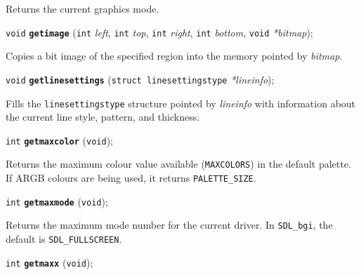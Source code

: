\documentclass[a4paper,12pt]{article}
\newcommand{\SDLbgi}{\texttt{SDL\_bgi}}
\newcommand{\V}{\texttt{void}}      %
\newcommand{\I}{\texttt{int}}       %
\newcommand{\func}[1]{\textbf{\texttt{#1}}}  %
\newcommand{\A}[1]{\emph{#1}}       %
\newcommand{\T}[1]{\texttt{#1}}     %
\newenvironment{bgi}
{ %
  \begin{snugshade}
}
{ %
  \end{snugshade}
}
\begin{document}
Returns the current graphics mode.


\label{sec:getimage}

\begin{bgi}
\V{} \func{getimage} (\I{} \A{left}, \I{} \A{top}, \I{} \A{right},
\I{} \A{bottom}, \V{} \A{*bitmap});
\end{bgi}

Copies a bit image of the specified region into the memory pointed by
\A{bitmap}.


\label{sec:getlinesettings}

\begin{bgi}
\V{} \func{getlinesettings} (\texttt{struct linesettingstype}
\A{*lineinfo});
\end{bgi}

Fills the \texttt{linesettingstype} structure pointed by \A{lineinfo}
with information about the current line style, pattern, and thickness.


\label{sec:getmaxcolor}

\begin{bgi}
\I{} \func{getmaxcolor} (\V{});
\end{bgi}

Returns the maximum colour value available (\T{MAXCOLORS}) in the
default palette. If ARGB colours are being used, it returns
\T{PALETTE\_SIZE}.


\label{sec:getmaxmode}

\begin{bgi}
\I{} \func{getmaxmode} (\V{});
\end{bgi}

Returns the maximum mode number for the current driver. In \SDLbgi,
the default is \T{SDL\_FULLSCREEN}.


\label{sec:getmaxx}

\begin{bgi}
\I{} \func{getmaxx} (\V{});
\end{bgi}
\end{document}
